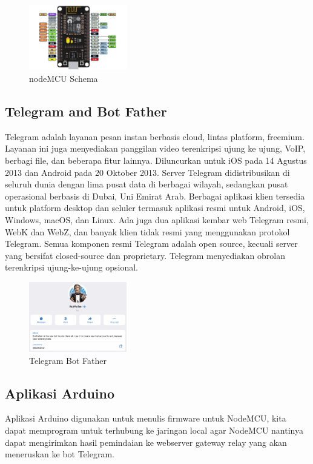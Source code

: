 \documentclass[conference]{IEEEtran}
\begin{document}
\begin{figure}[h]
  \centering
  \includegraphics[width=0.38\textwidth]{esp8266.jpg}
  \caption{nodeMCU Schema}
\end{figure}

\subsection{Telegram and Bot Father}
Telegram adalah layanan pesan instan berbasis cloud, lintas platform, freemium. Layanan ini juga menyediakan panggilan video terenkripsi ujung ke ujung, VoIP, berbagi file, dan beberapa fitur lainnya. Diluncurkan untuk iOS pada 14 Agustus 2013 dan Android pada 20 Oktober 2013. Server Telegram didistribusikan di seluruh dunia dengan lima pusat data di berbagai wilayah, sedangkan pusat operasional berbasis di Dubai, Uni Emirat Arab. Berbagai aplikasi klien tersedia untuk platform desktop dan seluler termasuk aplikasi resmi untuk Android, iOS, Windows, macOS, dan Linux. Ada juga dua aplikasi kembar web Telegram resmi, WebK dan WebZ, dan banyak klien tidak resmi yang menggunakan protokol Telegram. Semua komponen resmi Telegram adalah open source, kecuali server yang bersifat closed-source dan proprietary. Telegram menyediakan obrolan terenkripsi ujung-ke-ujung opsional.

\begin{figure}[h]
  \centering
  \includegraphics[width=0.38\textwidth]{botfather.png}
  \caption{Telegram Bot Father}
\end{figure}

\subsection{Aplikasi Arduino}
Aplikasi Arduino digunakan untuk menulis firmware untuk NodeMCU, kita dapat memprogram untuk terhubung ke jaringan local agar NodeMCU nantinya dapat mengirimkan hasil pemindaian ke webserver gateway relay yang akan meneruskan ke bot Telegram.
\end{document}
